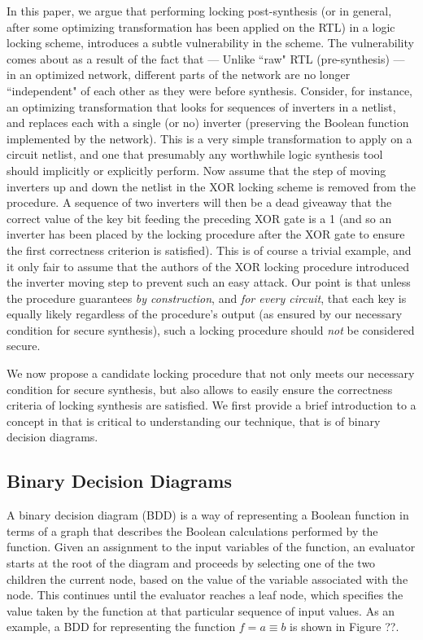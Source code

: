 In this paper, we argue that performing locking post-synthesis (or in general, after some optimizing transformation has been applied on the RTL) in a logic locking scheme, introduces a subtle vulnerability in the scheme. The vulnerability comes about as a result of the fact that --- Unlike ``raw" RTL (pre-synthesis) --- in an optimized network, different parts of the network are no longer ``independent" of each other as they were before synthesis. Consider, for instance, an optimizing transformation that looks for sequences of inverters in a netlist, and replaces each with a single (or no) inverter (preserving the Boolean function implemented by the network). This is a very simple transformation to apply on a circuit netlist, and one that presumably any worthwhile logic synthesis tool should implicitly or explicitly perform. Now assume that the step of moving inverters up and down the netlist in the XOR locking scheme is removed from the procedure. A sequence of two inverters will then be a dead giveaway that the correct value of the key bit feeding the preceding XOR gate is a 1 (and so an inverter has been placed by the locking procedure after the XOR gate to ensure the first correctness criterion is satisfied). This is of course a trivial example, and it only fair to assume that the authors of the XOR locking procedure introduced the inverter moving step to prevent such an easy attack. Our point is that unless the procedure guarantees \emph{by construction}, and \emph{for every circuit}, that each key is equally likely regardless of the procedure's output (as ensured by our necessary condition for secure synthesis), such a locking procedure should \emph{not} be considered secure.

We now propose a candidate locking procedure that not only meets our necessary condition for secure synthesis, but also allows to easily ensure the correctness criteria of locking synthesis are satisfied. We first provide a brief introduction to a concept in  that is critical to understanding our technique, that is of binary decision diagrams. 

\subsection{Binary Decision Diagrams}
A binary decision diagram (BDD) is a way of representing a Boolean function in terms of a graph that describes the Boolean calculations performed by the function. Given an assignment to the input variables of the function, an evaluator starts at the root of the diagram and proceeds by selecting one of the two children the current node, based on the value of the variable associated with the node. This continues until the evaluator reaches a leaf node, which specifies the value taken by the function at that particular sequence of input values. As an example, a BDD for representing the function $f = a \equiv b$ is shown in Figure ??.

